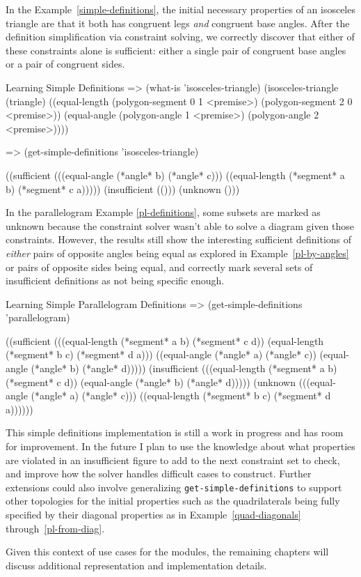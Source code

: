 In the Example~\ref{simple-definitions}, the initial necessary
properties of an isosceles triangle are that it both has congruent
legs \emph{and} congruent base angles. After the definition
simplification via constraint solving, we correctly discover that
either of these constraints alone is sufficient: either a single pair
of congruent base angles or a pair of congruent sides.

\begin{repl-example}
[label=simple-definitions]
{Learning Simple Definitions}
=> (what-is 'isosceles-triangle)
(isosceles-triangle
 (triangle)
 ((equal-length (polygon-segment 0 1 <premise>)
                (polygon-segment 2 0 <premise>))
  (equal-angle (polygon-angle 1 <premise>) (polygon-angle 2 <premise>))))

=> (get-simple-definitions 'isosceles-triangle)

((sufficient
  (((equal-angle (*angle* b) (*angle* c)))
   ((equal-length (*segment* a b) (*segment* c a)))))
 (insufficient (()))
 (unknown ()))
\end{repl-example}

In the parallelogram Example \ref{pl-definitions}, some subsets are
marked as unknown because the constraint solver wasn't able to solve a
diagram given those constraints. However, the results still show the
interesting sufficient definitions of \emph{either} pairs of opposite
angles being equal as explored in Example~\ref{pl-by-angles} or pairs
of opposite sides being equal, and correctly mark several sets of
insufficient definitions as not being specific enough.

\begin{repl-example}
[label=pl-definitions]
{Learning Simple Parallelogram Definitions}
=> (get-simple-definitions 'parallelogram)

((sufficient
  (((equal-length (*segment* a b) (*segment* c d))
    (equal-length (*segment* b c) (*segment* d a)))
   ((equal-angle (*angle* a) (*angle* c))
    (equal-angle (*angle* b) (*angle* d)))))
 (insufficient
  (((equal-length (*segment* a b) (*segment* c d))
    (equal-angle (*angle* b) (*angle* d)))))
 (unknown
  (((equal-angle (*angle* a) (*angle* c)))
   ((equal-length (*segment* b c) (*segment* d a))))))
\end{repl-example}

This simple definitions implementation is still a work in progress and
has room for improvement. In the future I plan to use the knowledge
about what properties are violated in an insufficient figure to add to
the next constraint set to check, and improve how the solver handles
difficult cases to construct. Further extensions could also involve
generalizing \texttt{get-simple-definitions} to support other
topologies for the initial properties such as the quadrilaterals being
fully specified by their diagonal properties as in
Example~\ref{quad-diagonals} through~\ref{pl-from-diag}.

Given this context of use cases for the modules, the remaining
chapters will discuss additional representation and implementation
details.
